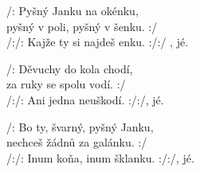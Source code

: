 
\ve{}
/: Pyšný Janku na okénku, \\
pyšný v poli, pyšný v šenku. :/ \\
/:/: Kajže ty si najdeš enku. :/:/ , jé. 

\ve{}
/: Děvuchy do kola chodí, \\
za ruky se spolu vodí. :/ \\
/:/: Ani jedna neuškodí. :/:/, jé. 

\ve{}
/: Bo ty, švarný, pyšný Janku, \\
nechceš žádnů za galánku. :/ \\
/:/: Inum koňa, inum šklanku. :/:/, jé. 

\esong{}